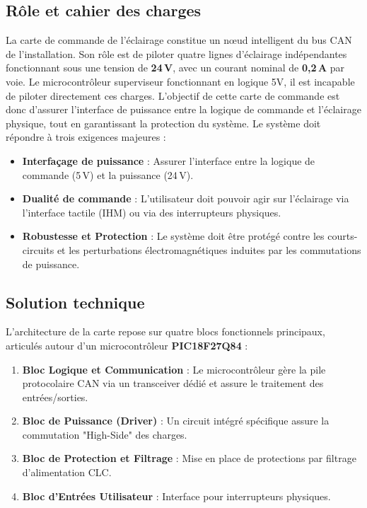         \subsection{Rôle et cahier des charges}
            La carte de commande de l'éclairage constitue un nœud intelligent du bus CAN de l'installation. Son rôle est de piloter quatre lignes d'éclairage indépendantes fonctionnant sous une tension de \textbf{24\,V}, avec un courant nominal de \textbf{0,2\,A} par voie. Le microcontrôleur superviseur fonctionnant en logique 5V, il est incapable de piloter directement ces charges. L'objectif de cette carte de commande est donc d'assurer l'interface de puissance entre la logique de commande et l'éclairage physique, tout en garantissant la protection du système. Le système doit répondre à trois exigences majeures :
            \begin{itemize}
                \item \textbf{Interfaçage de puissance} : Assurer l'interface entre la logique de commande (5\,V) et la puissance (24\,V).
                \item \textbf{Dualité de commande} : L'utilisateur doit pouvoir agir sur l'éclairage via l'interface tactile (IHM) ou via des interrupteurs physiques.
                \item \textbf{Robustesse et Protection} : Le système doit être protégé contre les courts-circuits et les perturbations électromagnétiques induites par les commutations de puissance.
            \end{itemize}

        
        \subsection{Solution technique}
            L'architecture de la carte repose sur quatre blocs fonctionnels principaux, articulés autour d'un microcontrôleur \textbf{PIC18F27Q84} :
            
            \begin{enumerate}
                \item \textbf{Bloc Logique et Communication} : Le microcontrôleur gère la pile protocolaire CAN via un transceiver dédié et assure le traitement des entrées/sorties.
                \item \textbf{Bloc de Puissance (Driver)} : Un circuit intégré spécifique assure la commutation "High-Side" des charges.
                \item \textbf{Bloc de Protection et Filtrage} : Mise en place de protections par filtrage d'alimentation CLC.
                \item \textbf{Bloc d'Entrées Utilisateur} : Interface pour interrupteurs physiques.
            \end{enumerate}

